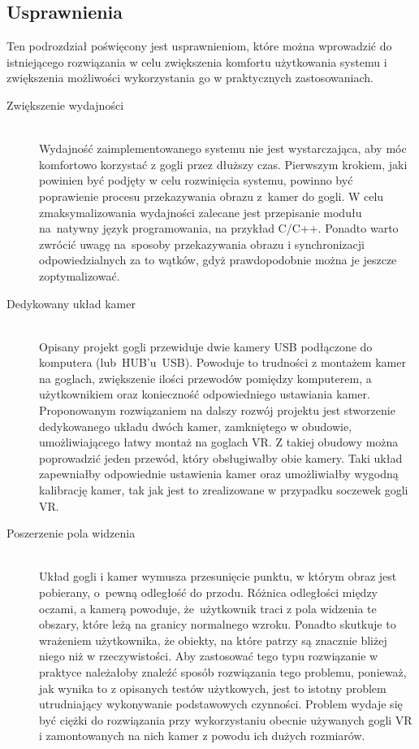 \documentclass[a4paper,11pt,twoside]{report}
\theoremstyle{definition}
\begin{document}
\subsection{Usprawnienia}

Ten podrozdział poświęcony jest usprawnieniom, które można wprowadzić do istniejącego rozwiązania w celu zwiększenia komfortu użytkowania systemu i zwiększenia możliwości wykorzystania go w praktycznych zastosowaniach.

\begin{description}
\item [Zwiększenie wydajności] \hfill \\
Wydajność zaimplementowanego systemu nie jest wystarczająca, aby móc komfortowo korzystać z gogli przez dłuższy czas. Pierwszym krokiem, jaki powinien być podjęty w celu rozwinięcia systemu, powinno być poprawienie procesu przekazywania obrazu z~kamer do gogli. W celu zmaksymalizowania wydajności zalecane jest przepisanie modułu na~natywny język programowania, na przykład C/C++. Ponadto warto zwrócić uwagę na~sposoby przekazywania obrazu i synchronizacji odpowiedzialnych za to wątków, gdyż prawdopodobnie można je jeszcze zoptymalizować.

\item [Dedykowany układ kamer] \hfill \\
Opisany projekt gogli przewiduje dwie kamery USB podłączone do komputera (lub~HUB'u~USB). Powoduje to trudności z montażem kamer na goglach, zwiększenie ilości przewodów pomiędzy komputerem, a użytkownikiem oraz konieczność odpowiedniego ustawiania kamer. Proponowanym rozwiązaniem na dalszy rozwój projektu jest stworzenie dedykowanego układu dwóch kamer, zamkniętego w obudowie, umożliwiającego łatwy montaż na goglach VR. Z takiej obudowy można poprowadzić jeden przewód, który obsługiwałby obie kamery. Taki układ zapewniałby odpowiednie ustawienia kamer oraz umożliwiałby wygodną kalibrację kamer, tak jak jest to zrealizowane w przypadku soczewek gogli VR.

\item [Poszerzenie pola widzenia] \hfill \\
Układ gogli i kamer wymusza przesunięcie punktu, w którym obraz jest pobierany, o~pewną odległość do przodu. Różnica odległości między oczami, a kamerą powoduje, że~użytkownik traci z pola widzenia te obszary, które leżą na granicy normalnego wzroku. Ponadto skutkuje to wrażeniem użytkownika, że obiekty, na które patrzy są znacznie bliżej niego niż w rzeczywistości. Aby zastosować tego typu rozwiązanie w praktyce należałoby znaleźć sposób rozwiązania tego problemu, ponieważ, jak wynika to z opisanych testów użytkowych, jest to istotny problem utrudniający wykonywanie podstawowych czynności. Problem wydaje się być ciężki do rozwiązania przy wykorzystaniu obecnie używanych gogli VR i zamontowanych na nich kamer z powodu ich dużych rozmiarów.
\end{description}
\end{document}
